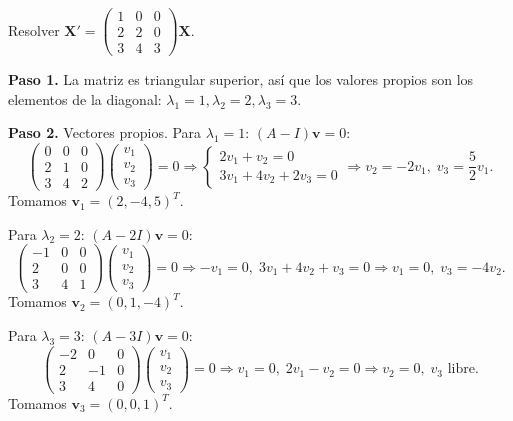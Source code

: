 \begin{example}
Resolver $\mathbf{X}'=
\begin{pmatrix}
1&0&0\\
2&2&0\\
3&4&3
\end{pmatrix}\mathbf{X}$.
\begin{myproof}
\textbf{Paso 1.} La matriz es triangular superior, así que los valores propios son los elementos de la diagonal: $\lambda_1=1,\lambda_2=2,\lambda_3=3$.

\textbf{Paso 2.} Vectores propios.
Para $\lambda_1=1$: $(A-I)\mathbf{v}=0$:
\[
\begin{pmatrix}
0&0&0\\
2&1&0\\
3&4&2
\end{pmatrix}
\begin{pmatrix}
v_1\\v_2\\v_3
\end{pmatrix}=0
\Rightarrow
\begin{cases}
2v_1+v_2=0\\
3v_1+4v_2+2v_3=0
\end{cases}
\Rightarrow v_2=-2v_1,\; v_3=\frac{5}{2}v_1.
\]
Tomamos $\mathbf{v}_1=(2,-4,5)^T$.

Para $\lambda_2=2$: $(A-2I)\mathbf{v}=0$:
\[
\begin{pmatrix}
-1&0&0\\
2&0&0\\
3&4&1
\end{pmatrix}
\begin{pmatrix}
v_1\\v_2\\v_3
\end{pmatrix}=0
\Rightarrow -v_1=0,\; 3v_1+4v_2+v_3=0\Rightarrow v_1=0,\; v_3=-4v_2.
\]
Tomamos $\mathbf{v}_2=(0,1,-4)^T$.

Para $\lambda_3=3$: $(A-3I)\mathbf{v}=0$:
\[
\begin{pmatrix}
-2&0&0\\
2&-1&0\\
3&4&0
\end{pmatrix}
\begin{pmatrix}
v_1\\v_2\\v_3
\end{pmatrix}=0
\Rightarrow v_1=0,\; 2v_1-v_2=0\Rightarrow v_2=0,\; v_3\text{ libre}.
\]
Tomamos $\mathbf{v}_3=(0,0,1)^T$.


\end{myproof}
\end{example}
